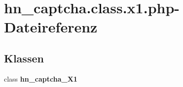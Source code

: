 \section{hn\_\-captcha.class.x1.php-Dateireferenz}
\label{hn__captcha_8class_8x1_8php}
\subsection*{Klassen}
\begin{CompactItemize}
\item 
class {\bf hn\_\-captcha\_\-X1}
\end{CompactItemize}
